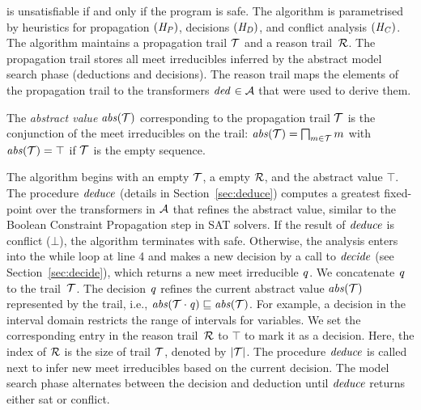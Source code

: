 is unsatisfiable if and only if the program is safe.  
The algorithm is parametrised by heuristics for propagation $(\mathit{H_P})$, 
decisions $(\mathit{H_D})$, and conflict analysis $(\mathit{H_C})$.
The algorithm maintains a propagation trail $\mathcal{T}$ and 
a reason trail~$\mathcal{R}$.
The propagation trail stores all meet irreducibles inferred by 
the abstract model search phase (deductions and decisions).  
The reason trail maps the elements of the propagation trail to the
transformers $\mathit{ded}^{}\in\mathcal{A}$ that were used to
derive them. 
%
\begin{definition} 
The \emph{abstract value} $\mathit{abs}(\mathcal{T})$ corresponding to 
the propagation trail $\mathcal{T}$ is the conjunction of the 
meet irreducibles on the trail:
$\mathit{abs}(\mathcal{T})=\bigsqcap_{m \in \mathcal{T}}m$ with
$\mathit{abs}(\mathcal{T})=\top$ if $\mathcal{T}$ is the empty sequence.
\end{definition}
%
The algorithm begins with an empty $\mathcal{T}$, a empty $\mathcal{R}$, and the
abstract value $\top$.  The procedure $\mathit{deduce}$ (details in
Section~\ref{sec:deduce}) computes a greatest fixed-point over the
transformers in $\mathcal{A}$ that refines the abstract value,
similar to the Boolean Constraint Propagation
step in SAT solvers.  If the result of $\mathit{deduce}$
is \textsf{conflict} ($\bot$), the algorithm terminates with
\textsf{safe}.  Otherwise, the analysis enters into the while loop at line 4
and makes a new decision by a call to $\mathit{decide}$ (see
Section~\ref{sec:decide}), which returns a new meet irreducible
$\mathit{q}$.
%
%
We concatenate $\mathit{q}$ to the trail~$\mathcal{T}$.  The decision
$\mathit{q}$ refines the current abstract value $\mathit{abs}(\mathcal{T})$ represented
by the trail, i.e., $\mathit{abs}(\mathcal{T}\cdot\mathit{q})\sqsubseteq \mathit{abs}(\mathcal{T})$.
%
%
For example, a decision in the interval domain restricts the range of 
intervals for variables.
%
We set the corresponding entry in the reason trail~$\mathcal{R}$ to $\top$
to mark it as a decision.  Here, the index of $\mathcal{R}$ is the size 
of trail $\mathcal{T}$, denoted by $|\mathcal{T}|$.
%
The procedure $\mathit{deduce}$ is called next to infer new meet irreducibles
based on the current decision.  The model search phase
alternates between the decision and deduction until $\mathit{deduce}$ returns
either \textsf{sat} or \textsf{conflict}.  

